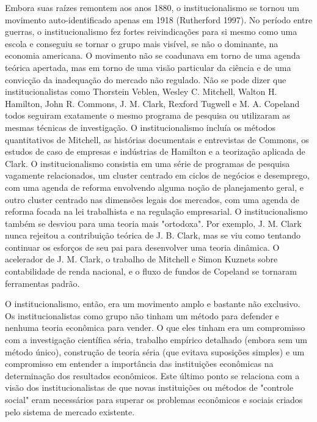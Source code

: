 \documentclass[a4paper,12pt]{article}[abntex2]
\begin{document}
Embora suas raízes remontem aos anos 1880, o institucionalismo se tornou um movimento auto-identificado apenas em 1918 (Rutherford 1997). No período entre guerras, o institucionalismo fez fortes reivindicações para si mesmo como uma escola e conseguiu se tornar o grupo mais visível, se não o dominante, na economia americana. O movimento não se coadunava em torno de uma agenda teórica apertada, mas em torno de uma visão particular da ciência e de uma convicção da inadequação do mercado não regulado. Não se pode dizer que institucionalistas como Thorstein Veblen, Wesley C. Mitchell, Walton H. Hamilton, John R. Commons, J. M. Clark, Rexford Tugwell e M. A. Copeland todos seguiram exatamente o mesmo programa de pesquisa ou utilizaram as mesmas técnicas de investigação. O institucionalismo incluía os métodos quantitativos de Mitchell, as histórias documentais e entrevistas de Commons, os estudos de caso de empresas e indústrias de Hamilton e a teorização aplicada de Clark. O institucionalismo consistia em uma série de programas de pesquisa vagamente relacionados, um cluster centrado em ciclos de negócios e desemprego, com uma agenda de reforma envolvendo alguma noção de planejamento geral, e outro cluster centrado nas dimensões legais dos mercados, com uma agenda de reforma focada na lei trabalhista e na regulação empresarial. O institucionalismo também se desviou para uma teoria mais "ortodoxa". Por exemplo, J. M. Clark nunca rejeitou a contribuição teórica de J. B. Clark, mas se viu como tentando continuar os esforços de seu pai para desenvolver uma teoria dinâmica. O acelerador de J. M. Clark, o trabalho de Mitchell e Simon Kuznets sobre contabilidade de renda nacional, e o fluxo de fundos de Copeland se tornaram ferramentas padrão.

O institucionalismo, então, era um movimento amplo e bastante não exclusivo. Os institucionalistas como grupo não tinham um método para defender e nenhuma teoria econômica para vender. O que eles tinham era um compromisso com a investigação científica séria, trabalho empírico detalhado (embora sem um método único), construção de teoria séria (que evitava suposições simples) e um compromisso em entender a importância das instituições econômicas na determinação dos resultados econômicos. Este último ponto se relaciona com a visão dos institucionalistas de que novas instituições ou métodos de "controle social" eram necessários para superar os problemas econômicos e sociais criados pelo sistema de mercado existente.
\end{document}
